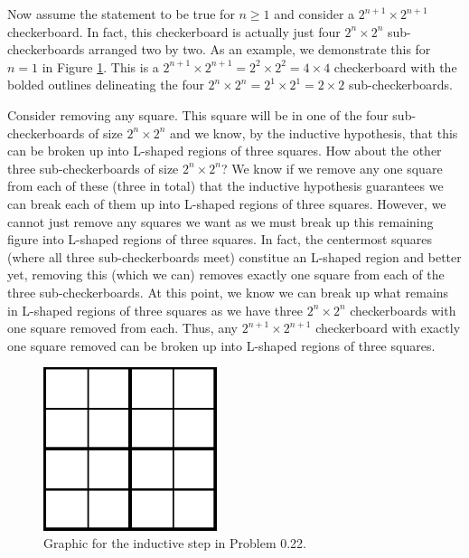 \documentclass[12pt]{article}
\numberwithin{theorem}{section}
\numberwithin{equation}{section}
\numberwithin{remark}{section}
\numberwithin{definition}{section}
\numberwithin{theorem}{section}
\numberwithin{lemma}{section}
\numberwithin{example}{section}
\begin{document}
Now assume the statement to be true for $n\ge 1$ and consider a $2^{n+1}\times2^{n+1}$ checkerboard. In fact, this checkerboard is actually just four $2^{n}\times2^{n}$ sub-checkerboards arranged two by two. As an example, we demonstrate this for $n=1$ in Figure \ref{fig:problem_0.22_1}. This is a $2^{n+1}\times 2^{n+1} = 2^2\times 2^2=4\times4$ checkerboard with the bolded outlines delineating the four $2^{n}\times 2^{n} = 2^1\times 2^1=2\times2$ sub-checkerboards. 

Consider removing any square. This square will be in one of the four sub-checkerboards of size $2^n\times2^n$ and we know, by the inductive hypothesis, that this can be broken up into L-shaped regions of three squares. How about the other three sub-checkerboards of size $2^n\times2^n$? We know if we remove any one square from each of these (three in total) that the inductive hypothesis guarantees we can break each of them up into L-shaped regions of three squares. However, we cannot just remove any squares we want as we must break up this remaining figure into L-shaped regions of three squares. In fact, the centermost squares (where all three sub-checkerboards meet) constitue an L-shaped region and better yet, removing this (which we can) removes exactly one square from each of the three sub-checkerboards. At this point, we know we can break up what remains in L-shaped regions of three squares as we have three $2^n\times2^n$ checkerboards with one square removed from each. Thus, any $2^{n+1}\times 2^{n+1}$ checkerboard with exactly one square removed can be broken up into L-shaped regions of three squares. 

\begin{figure}
	\begin{center}
		\includegraphics[width=2in]{fig/problem_0.22_1.png}
		\caption{Graphic for the inductive step in Problem 0.22.}
		\label{fig:problem_0.22_1}
	\end{center}
\end{figure}
\end{document}
